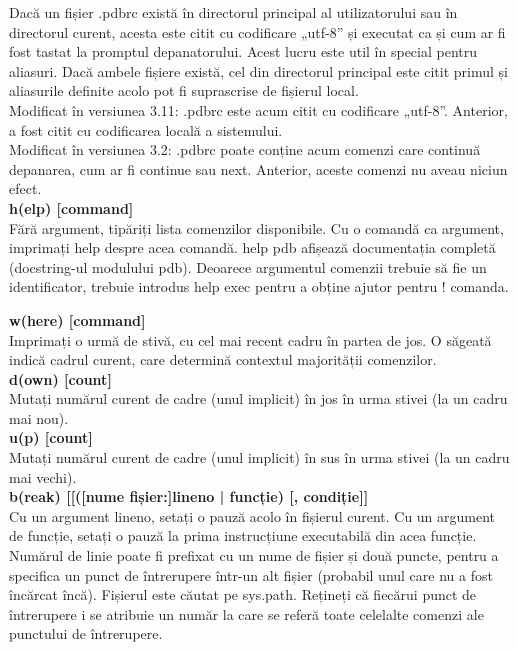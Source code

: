 \documentclass[oneside,20pt]{article}          %
\begin{document}
Dacă un fișier .pdbrc există în directorul principal al utilizatorului sau în directorul curent, acesta este citit cu codificare „utf-8” și executat ca și cum ar fi fost tastat la promptul depanatorului. Acest lucru este util în special pentru aliasuri. Dacă ambele fișiere există, cel din directorul principal este citit primul și aliasurile definite acolo pot fi suprascrise de fișierul local.\\

Modificat în versiunea 3.11: .pdbrc este acum citit cu codificare „utf-8”. Anterior, a fost citit cu codificarea locală a sistemului.\\

Modificat în versiunea 3.2: .pdbrc poate conține acum comenzi care continuă depanarea, cum ar fi continue sau next. Anterior, aceste comenzi nu aveau niciun efect.\\

\textbf{h(elp) [command]}\\
Fără argument, tipăriți lista comenzilor disponibile. Cu o comandă ca argument, imprimați help despre acea comandă. help pdb afișează documentația completă (docstring-ul modulului pdb). Deoarece argumentul comenzii trebuie să fie un identificator, trebuie introdus help exec pentru a obține ajutor pentru ! comanda.

\textbf{w(here) [command]}\\
Imprimați o urmă de stivă, cu cel mai recent cadru în partea de jos. O săgeată indică cadrul curent, care determină contextul majorității comenzilor.\\

\textbf{d(own) [count]}\\
Mutați numărul curent de cadre (unul implicit) în jos în urma stivei (la un cadru mai nou).\\

\textbf{u(p) [count]}\\
Mutați numărul curent de cadre (unul implicit) în sus în urma stivei (la un cadru mai vechi).\\

\textbf{b(reak) [[([nume fișier:]lineno | funcție) [, condiție]]}\\
Cu un argument lineno, setați o pauză acolo în fișierul curent. Cu un argument de funcție, setați o pauză la prima instrucțiune executabilă din acea funcție. Numărul de linie poate fi prefixat cu un nume de fișier și două puncte, pentru a specifica un punct de întrerupere într-un alt fișier (probabil unul care nu a fost încărcat încă). Fișierul este căutat pe sys.path. Rețineți că fiecărui punct de întrerupere i se atribuie un număr la care se referă toate celelalte comenzi ale punctului de întrerupere.\\
\end{document}
